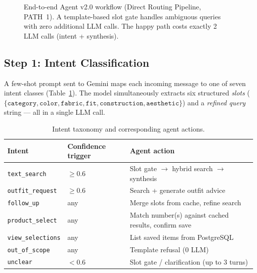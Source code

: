 \documentclass[12pt,a4paper]{article}
\begin{document}
\begin{figure}[H]
\caption{End-to-end Agent v2.0 workflow (Direct Routing Pipeline, PATH~1).
         A template-based slot gate handles ambiguous queries with zero
         additional LLM calls. The happy path costs exactly 2 LLM calls
         (intent + synthesis).}
\label{fig:agent_flow}
\end{figure}

\subsection{Step 1: Intent Classification}

A few-shot prompt sent to Gemini maps each incoming message to one of
seven intent classes (Table~\ref{tab:intents}).
The model simultaneously extracts six structured \emph{slots}
($\{\texttt{category}, \texttt{color}, \texttt{fabric},
\texttt{fit}, \texttt{construction}, \texttt{aesthetic}\}$)
and a \emph{refined query} string --- all in
a single LLM call.

\begin{table}[H]
\centering
\begin{tabularx}{\linewidth}{llX}
\toprule
\textbf{Intent} & \textbf{Confidence trigger} & \textbf{Agent action} \\
\midrule
\texttt{text\_search}     & $\geq 0.6$  & Slot gate $\to$ hybrid search $\to$ synthesis \\
\texttt{outfit\_request}  & $\geq 0.6$  & Search + generate outfit advice \\
\texttt{follow\_up}       & any         & Merge slots from cache, refine search \\
\texttt{product\_select}  & any         & Match number(s) against cached results, confirm save \\
\texttt{view\_selections} & any         & List saved items from PostgreSQL \\
\texttt{out\_of\_scope}   & any         & Template refusal (0 LLM) \\
\texttt{unclear}          & $< 0.6$     & Slot gate / clarification (up to 3 turns) \\
\bottomrule
\end{tabularx}
\caption{Intent taxonomy and corresponding agent actions.}
\label{tab:intents}
\end{table}
\end{document}
